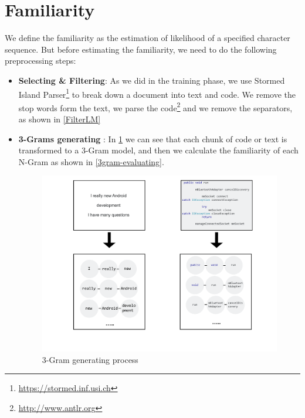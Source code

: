 \documentclass[12pt,mscthesis]{usiinfthesis}
\begin{document}
	\section{Familiarity}
	We define the familiarity as the estimation of likelihood of a specified character sequence. But before estimating the familiarity, we need to do the following preprocessing steps:
	\begin{itemize}
		\item \textbf{Selecting \& Filtering}: As we did in the training phase, we use Stormed Island Parser\footnote{\url{https://stormed.inf.usi.ch}} \cite{Ponz2015a} to break down a document into text and code. We remove the stop words form the text, we parse the code\footnote{\url{http://www.antlr.org}} and we remove the separators, as shown in \cref{FilterLM}
		\item \textbf{3-Grams generating }: In \cref{3gram-generating} we can see that each chunk of code or text is transformed to a 3-Gram model, and then we calculate the familiarity of each N-Gram as shown in \cref{3gram-evaluating}.
			
			\begin{figure}[htbp]
			\centering
			\includegraphics[width=\textwidth]{3gram-generating}
			\caption{3-Gram generating process}
			\label{3gram-generating}
			\end{figure}


\end{itemize}
\end{document}
